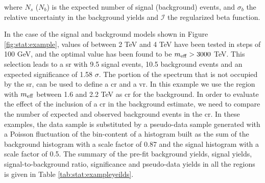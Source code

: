 \noindent where $N_s$ ($N_b$) is the expected number of signal (background) events, and $\sigma_b$ the relative uncertainty in the background yields and $\mathcal{I}$ the regularized beta function. 

In the case of the signal and background models shown in Figure \ref{fig:stat:example}, values of \meff between 2 TeV and 4 TeV have been tested in steps of 100 GeV, and the optimal value has been found to be $m_{\mathrm{eff}} > 3000$ TeV. This selection leads to a \gls{sr} with  9.5 signal events, 10.5 background events and an expected significance of 1.58 $\sigma$. 
The portion of the \meff spectrum that is not occupied by the \gls{sr}, can be used to define a \gls{cr} and a \gls{vr}.
In this example we use the region with $m_{\mathrm{eff}}$ between 1.6 and 2.2 TeV as \gls{cr} for the background. 
In order to evaluate the effect of the inclusion of a \gls{cr} in the background estimate, we need to compare the number of expected and observed background events in the \gls{cr}. 
In these examples, the data sample is substituted by a pseudo-data sample generated with a Poisson fluctuation 
of the bin-content of a histogram built as the sum of the background histogram with a scale factor of 0.87 and the signal histogram with a scale factor of 0.5. The summary of the pre-fit background yields, signal yields, signal-to-background ratio, significance and pseudo-data yields in all the regions is given in Table \ref{tab:stat:exampleyeilds}.


